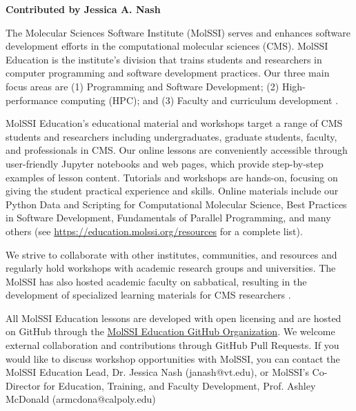 
\textbf{Contributed by Jessica A. Nash}

 The Molecular Sciences Software Institute (MolSSI) serves and enhances software development efforts in the computational molecular sciences (CMS). MolSSI Education is the institute's division that trains students and researchers in computer programming and software development practices. Our three main focus areas are (1) Programming and Software Development; (2) High-performance computing (HPC); and (3) Faculty and curriculum development \cite{NashCISE}. 

MolSSI Education’s educational material and workshops target a range of CMS students and researchers including undergraduates, graduate students, faculty, and professionals in CMS. 
Our online lessons are conveniently accessible through user-friendly Jupyter notebooks and web pages, which provide step-by-step examples of lesson content. 
Tutorials and workshops are hands-on, focusing on giving the student practical experience and skills. 
Online materials include our Python Data and Scripting for Computational Molecular Science, Best Practices in Software Development, Fundamentals of Parallel Programming, and many others (see \href{https://education.molssi.org/resources}{https://education.molssi.org/resources} for a complete list). 

We strive to collaborate with other institutes, communities, and resources and regularly hold workshops with academic research groups and universities. The MolSSI has also hosted academic faculty on sabbatical, resulting in the development of specialized learning materials for CMS researchers \cite{Craig2022}.  

All MolSSI Education lessons are developed with open licensing and are hosted on GitHub through the \href{https://github.com/molssi-education}{MolSSI Education GitHub Organization}. We welcome external collaboration and contributions through GitHub Pull Requests. If you would like to discuss workshop opportunities with MolSSI, you can contact the MolSSI Education Lead, Dr. Jessica Nash (janash@vt.edu), or MolSSI's Co-Director for Education, Training, and Faculty Development, Prof. Ashley McDonald (armcdona@calpoly.edu)